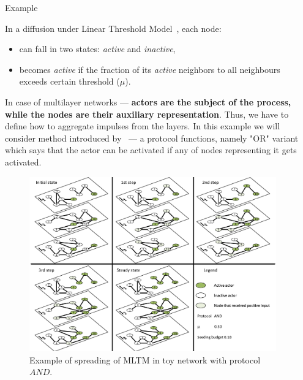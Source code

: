 \documentclass[final]{beamer}
\newlength{\sepwidth}
\newlength{\colwidth}
\newcommand{\separatorcolumn}{\begin{column}{\sepwidth}\end{column}}
\begin{document}
\begin{frame}[t, fragile]
\begin{columns}[t]
\separatorcolumn
\begin{column}{\colwidth}

\begin{alertblock}{Example}

    In a diffusion under Linear Threshold Model~\cite{kempe2003maximizing}, each node:
    \begin{itemize}
        \item can fall in two states: \textit{active} and \textit{inactive},
        \item becomes \textit{active} if the fraction of its \textit{active} neighbors to all 
        neighbours exceeds certain threshold ($\mu$).
    \end{itemize}
    In case of multilayer networks --- \textbf{actors are the subject of the process, while the 
    nodes are their auxiliary representation}. Thus, we have to define how to aggregate impulses 
    from the layers. In this example we will consider method introduced by~\cite{zhong2022mltm} --- 
    a protocol functions, namely "OR" variant which says that the actor can be activated if any of 
    nodes representing it gets activated.

    \begin{figure}
        \centering
        \includegraphics[width=1\linewidth]{figures/ltm_example.pdf}
        \caption{Example of spreading of MLTM in toy network with protocol $AND$.}
        \label{fig:ltm_example_and}
    \end{figure}


\end{alertblock}
\end{column}
\end{columns}
\end{frame}
\end{document}
